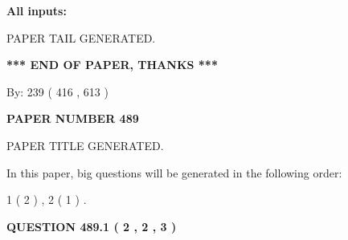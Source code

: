 \documentclass[12pt]{article}
\begin{document}
   
   
   
\noindent{}
   
   
   
   
\noindent\vspace{0.1in}\hspace{-0.08in} {\textbf{\Large{All inputs: }}}
   
   
   
   
   
   
 \vspace{0.2in}
 
   
   
\vspace{2.0in} PAPER TAIL GENERATED.
   
   
   
   
\vspace{1.0in} 
{\textbf{\large{ *** END OF PAPER, THANKS *** }}} 
   
   
\hspace{1.0in} By: 
 239 ( 416 ,  613 )
   
   
   
   
\newpage 
\setcounter{page}{ 
   489001 } 
   
   
   
   
 {\textbf{ \Large{ PAPER NUMBER  489  }}}
   
   
\vspace{0.2in}
   
   
   
   
   
   
   
   
 \vspace{0.2in}
 
 
 
 
   
   
 PAPER TITLE GENERATED.
   
   
   
\vspace{0.2in}
   
In this paper, big questions will be generated in the following order: 
   
   
   1 ( 2 )
 ,
   2 ( 1 )
 .
  
\vspace{0.2in}
  
{\textbf{\Large{QUESTION
489.1 
 ( 2 , 2 , 3 )
}}}
  
\end{document}
